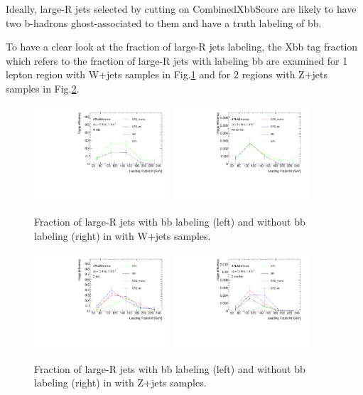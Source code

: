 \par Ideally, large-R jets selected by cutting on CombinedXbbScore are likely to have two b-hadrons ghost-associated to them and have a truth labeling of bb.

\par To have a clear look at the fraction of large-R jets labeling, the Xbb tag fraction which refers to the fraction of large-R jets with labeling bb are examined for 1 lepton region with W+jets samples in Fig.\ref{fig:xbbw} and for 2 regions with Z+jets samples in Fig.\ref{fig:xbbz}.

\begin{figure}[h]
    \centering
    \includegraphics[width=0.45\textwidth]{appendices/figures/eff_W}
    \includegraphics[width=0.45\textwidth]{appendices/figures/eff_Wnon}
    \caption{Fraction of large-R jets with bb labeling (left) and without bb labeling (right) in with W+jets samples.}
    \label{fig:xbbw}
\end{figure}

\begin{figure}[h]
    \centering
    \includegraphics[width=0.45\textwidth]{appendices/figures/eff_Z}
    \includegraphics[width=0.45\textwidth]{appendices/figures/eff_Znon}
    \caption{Fraction of large-R jets with bb labeling (left) and without bb labeling (right) in with Z+jets samples.}
    \label{fig:xbbz}
\end{figure}

